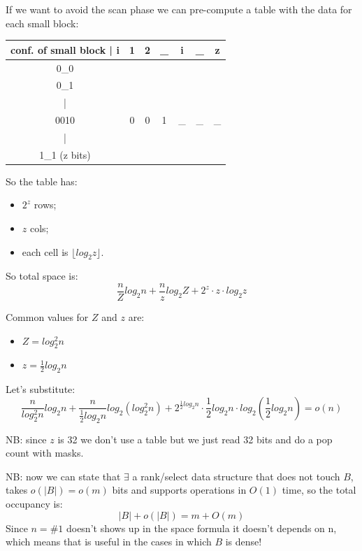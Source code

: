 If we want to avoid the scan phase we can pre-compute a table with the data for each small block:
\begin{table}[H]
    \centering
    \begin{tabular}{c|c c c c c c}
        conf. of small block | i & 1 & 2 & \_ & i & \_ & z \\
        \hline
        0\_0 &  &  &  &  &  &  \\
        0\_1 &  &  &  &  &  &  \\
        | &  &  &  &  &  &  \\
        0010 & 0 & 0 & 1 & \_ & \_ & \_ \\
        | &  &  &  &  &  &  \\
        1\_1 (z bits) &  &  &  &  &  &  \\
    \end{tabular}
\end{table}
So the table has:
\begin{itemize}
    \item $2^z$ rows;
    \item $z$ cols;
    \item each cell is $\lfloor log_2 z \rfloor$.
\end{itemize}
So total space is:
$$
    \frac{n}{Z}log_2 n + \frac{n}{z}log_2 Z + 2^z \cdot z \cdot log_2 z
$$

Common values for $Z$ and $z$ are:
\begin{itemize}
    \item $Z = log_2^2 n$
    \item $z = \frac{1}{2}log_2 n$
\end{itemize}
Let's substitute:
$$
    \frac{n}{log_2^2n}log_2 n + \frac{n}{\frac{1}{2}log_2 n}log_2 (log_2^2 n) + 2^{\frac{1}{2}log_2 n} \cdot \frac{1}{2}log_2 n \cdot log_2 \left( \frac{1}{2}log_2 n \right) = o(n)
$$

NB: since $z$ is 32 we don't use a table but we just read 32 bits and do a pop count with masks.

NB: now we can state that $\exists$ a rank/select data structure that does not touch $B$, takes $o(|B|) = o(m)$ bits and supports operations in $O(1)$ time, so the total occupancy is:
$$
    |B| + o(|B|) = m + O(m)
$$
Since $n = \#1$ doesn't shows up in the space formula it doesn't depends on n, which means that is useful in the cases in which $B$ is dense!

